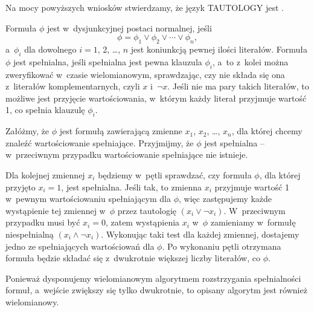 Na mocy powyższych wniosków stwierdzamy, że język TAUTOLOGY jest .

\exercise %
Formuła $\phi$ jest w~dysjunkcyjnej postaci normalnej, jeśli
\[
	\phi = \phi_1\vee\phi_2\vee\cdots\vee\phi_n,
\]
a~$\phi_i$ dla dowolnego $i=1$, 2, \dots, $n$ jest koniunkcją pewnej ilości literałów.
Formuła $\phi$ jest spełnialna, jeśli spełnialna jest pewna klauzula $\phi_i$, a~to z~kolei można zweryfikować w~czasie wielomianowym, sprawdzając, czy nie składa się ona z~literałów komplementarnych, czyli $x$ i~$\neg x$.
Jeśli nie ma pary takich literałów, to możliwe jest przyjęcie wartościowania, w~którym każdy literał przyjmuje wartość 1, co spełnia klauzulę $\phi_i$.

\exercise %
Załóżmy, że $\phi$ jest formułą zawierającą zmienne $x_1$, $x_2$, \dots, $x_n$, dla której chcemy znaleźć wartościowanie spełniające.
Przyjmijmy, że $\phi$ jest spełnialna -- w~przeciwnym przypadku wartościowanie spełniające nie istnieje.

Dla kolejnej zmiennej $x_i$ będziemy w~pętli sprawdzać, czy formuła $\phi$, dla której przyjęto $x_i=1$, jest spełnialna.
Jeśli tak, to zmienna $x_i$ przyjmuje wartość 1 w~pewnym wartościowaniu spełniającym dla $\phi$, więc zastępujemy każde wystąpienie tej zmiennej w~$\phi$ przez tautologię $(x_i\vee\neg x_i)$.
W~przeciwnym przypadku musi być $x_i=0$, zatem wystąpienia $x_i$ w~$\phi$ zamieniamy w~formułę niespełnialną $(x_i\wedge\neg x_i)$.
Wykonując taki test dla każdej zmiennej, dostajemy jedno ze spełniających wartościowań dla $\phi$.
Po wykonaniu pętli otrzymana formuła będzie składać się z~dwukrotnie większej liczby literałów, co $\phi$.

Ponieważ dysponujemy wielomianowym algorytmem rozstrzygania spełnialności formuł, a~wejście zwiększy się tylko dwukrotnie, to opisany algorytm jest również wielomianowy.

\exercise %
